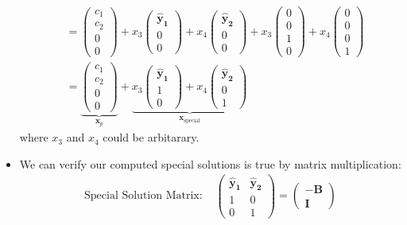 \begin{itemize}
\begin{align}
&=\begin{pmatrix}
c_1\\c_2\\0\\0
\end{pmatrix} +  x_3\begin{pmatrix}
\bm{\hat y_1}\\0\\0
\end{pmatrix}+x_4\begin{pmatrix}
\bm{\hat y_2}\\0\\0
\end{pmatrix} + x_3\begin{pmatrix}
0\\0\\1\\0
\end{pmatrix} + x_4\begin{pmatrix}
0\\0\\0\\1
\end{pmatrix}\\
&=\underbrace{\begin{pmatrix}
c_1\\c_2\\0\\0
\end{pmatrix}}_{\bm x_p}
+\underbrace{x_3\begin{pmatrix}
\bm{\hat y_1}\\1\\0
\end{pmatrix} + x_4\begin{pmatrix}
\bm{\hat y_2}\\0\\1
\end{pmatrix}}_{\bm x_{\text{special}}}
\end{align}                                          
where $x_3$ and $x_4$ could be arbitarary.
\item
We can verify our computed special solutions is true by matrix multiplication:
\[
\begin{aligned}
\mbox{Special Solution Matrix: }&
\begin{pmatrix}
\bm{\hat y_1}&\bm{\hat y_2}\\1&0\\0&1
\end{pmatrix}
= \begin{pmatrix}
-\bm B\\\bm I

\end{pmatrix}
\end{aligned}\]
\end{itemize}

